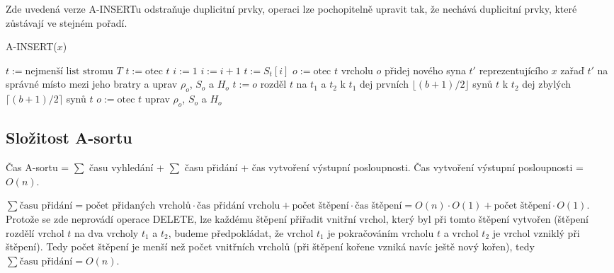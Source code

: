 Zde uvedená verze A-INSERTu odstraňuje 
duplicitní prvky, operaci lze pochopitelně upravit tak, že nechává 
duplicitní prvky, které zůstávají ve stejném pořadí.

\begin{algorithm}[!htb]
\caption{A-INSERT($x$)}
\label{alg:abtree.a-insert}
\begin{algorithmic}
\STATE {}
\STATE $t := \text{nejmenší list stromu } T$
\REPEAT
	\STATE $t := \text{otec } t$
\STATE {}
	\STATE $i := 1$
		\STATE $i := i + 1$
	\ENDWHILE
	\STATE $t := S_t[i]$ 
\ENDWHILE
\STATE {}
	\STATE $o := \text{otec } t$
	\STATE vrcholu $o$ přidej nového syna $t'$ 
	reprezentujícího $x$
	\STATE zařaď $t'$ na správné místo mezi jeho bratry
	a uprav $\rho_o$, $S_o$ a $H_o$
	\STATE $t := o$
		\STATE {}
		\STATE rozděl $t$ na $t_1$ a $t_2$ 
		\STATE \quad k $t_1$ dej prvních 
			$\lfloor (b+1)/2 \rfloor$ synů $t$
		\STATE \quad k $t_2$ dej zbylých 
			$\lceil (b+1)/2 \rceil$ synů $t$
		\STATE $o := \text{otec } t$
		\STATE uprav $\rho_o$, $S_o$ a $H_o$
		\STATE {}
	\ENDWHILE
\ENDIF
\end{algorithmic}
\end{algorithm}

\subsection{Složitost A-sortu}

Čas A-sortu
= $\sum$ času vyhledání + $\sum$ času přidání + čas vytvoření výstupní
posloupnosti.
Čas vytvoření výstupní posloupnosti = $O(n)$.

$\sum \text{času přidání} 
= \text{počet přidaných vrcholů} \cdot \text{čas přidání vrcholu}
+ \text{počet štěpení} \cdot \text{čas štěpení}
= O(n) \cdot O(1)
+ \text{počet štěpení} \cdot O(1).$ 
Protože se zde neprovádí operace DELETE, lze každému štěpení přiřadit 
vnitřní vrchol, který byl při tomto štěpení vytvořen (štěpení rozdělí 
vrchol $t$ na dva vrcholy $t_1$ a $t_2$, budeme předpokládat, že 
vrchol $t_1$ je pokračováním vrcholu $t$ a vrchol $t_2$ je vrchol 
vzniklý při štěpení). Tedy počet štěpení je menší než počet vnitřních 
vrcholů (při štěpení kořene vzniká navíc ještě nový kořen),  
tedy $\sum \text{času přidání} = O(n).$

